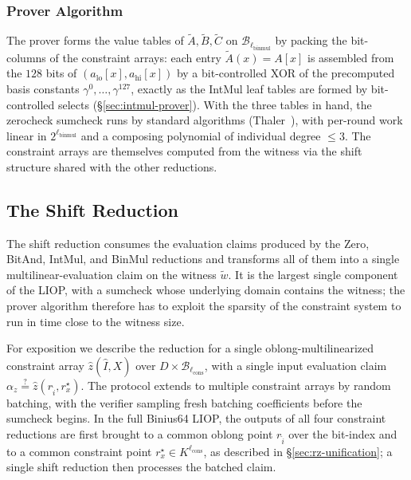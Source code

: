 \documentclass{article}
\theoremstyle{definition}
\newcommand*{\mle}{\widetilde}
\newcommand{\BB}{\mathcal{B}}
\begin{document}
\subsubsection{Prover Algorithm}
\label{sec:binmul-prover}

The prover forms the value tables of $\mle{A}, \mle{B}, \mle{C}$ on $\BB_{\ell_\text{binmul}}$ by packing the bit-columns of the constraint arrays: each entry $\mle{A}(x) = A[x]$ is assembled from the $128$ bits of $(a_\text{lo}[x], a_\text{hi}[x])$ by a bit-controlled XOR of the precomputed basis constants $\gamma^0, \ldots, \gamma^{127}$, exactly as the IntMul leaf tables are formed by bit-controlled selects (\S\ref{sec:intmul-prover}). With the three tables in hand, the zerocheck sumcheck runs by standard algorithms (Thaler~\cite[\S 4.1]{Thaler:2022aa}), with per-round work linear in $2^{\ell_\text{binmul}}$ and a composing polynomial of individual degree $\leq 3$. The constraint arrays are themselves computed from the witness via the shift structure shared with the other reductions.

\subsection{The Shift Reduction}
\label{sec:shift-reduction}

The shift reduction consumes the evaluation claims produced by the Zero, BitAnd, IntMul, and BinMul reductions and transforms all of them into a single multilinear-evaluation claim on the witness $\mle{w}$. It is the largest single component of the LIOP, with a sumcheck whose underlying domain contains the witness; the prover algorithm therefore has to exploit the sparsity of the constraint system to run in time close to the witness size.

For exposition we describe the reduction for a single oblong-multilinearized constraint array $\widehat{z}(\widehat{I}, X)$ over $D \times \BB_{\ell_\text{cons}}$, with a single input evaluation claim $\alpha_z \stackrel{?}{=} \widehat{z}(r_{\widehat{i}}, r^\star_x)$. The protocol extends to multiple constraint arrays by random batching, with the verifier sampling fresh batching coefficients before the sumcheck begins. In the full Binius64 LIOP, the outputs of all four constraint reductions are first brought to a common oblong point $r_{\widehat{i}}$ over the bit-index and to a common constraint point $r^\star_x \in K^{\ell_\text{cons}}$, as described in \S\ref{sec:rz-unification}; a single shift reduction then processes the batched claim.
\end{document}
